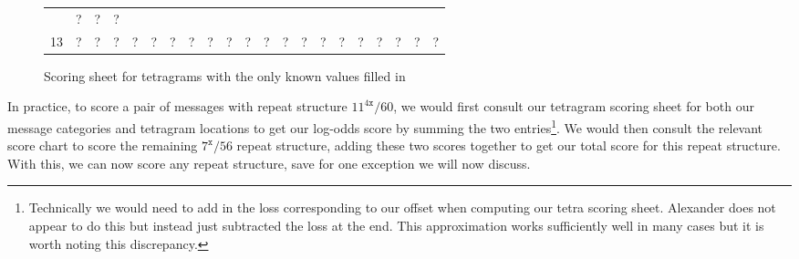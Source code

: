 \begin{figure}[H]
\begin{center}
{\begin{tabular}{|c|*{20}{c|}}
        & ?              & ?            & ?                             \\
        13            & ?              & ?            & ?             & ?
        & ?              & ?            & ?             & ?           &
        ?             & ?              & ?            & ?             & ?
        & ?              & ?            & ?             & ?
        & ?              & ?            & ?                             \\
        \hline
    \end{tabular}}
  \end{center}
  \caption{Scoring sheet for tetragrams with the only known values filled in}
\end{figure}
\noindent In practice, to score a pair of messages with repeat structure
$11^{4\texttt{x}}/60$, we would first consult our tetragram scoring
sheet for both our message categories and tetragram locations to get our
log-odds score by summing the two entries\footnote{Technically we
  would need to add in the loss corresponding to our offset when
  computing our tetra scoring sheet. Alexander does not appear to do
  this but instead just subtracted the loss at the end. This
  approximation works sufficiently well in many cases but it is worth
noting this discrepancy. }. We would then consult the relevant
score chart to score
the remaining $7^\texttt{x}/56$ repeat structure, adding these two
scores together to get our total score for this repeat structure.
With this, we can now score any repeat structure, save for one
exception we will now discuss.

